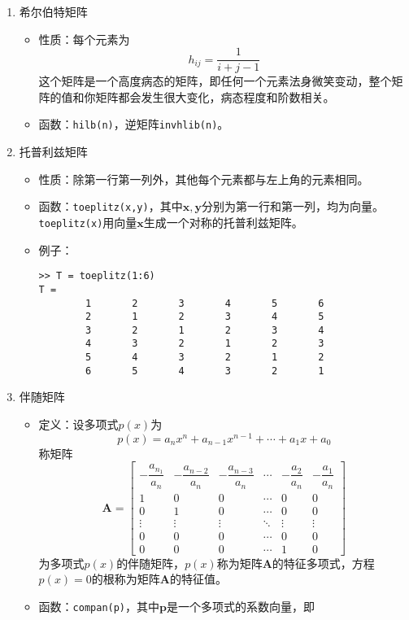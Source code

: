 \begin{enumerate}
\item 希尔伯特矩阵
\begin{itemize}
	\item 性质：每个元素为
	\begin{equation}
		h_{ij}=\frac{1}{i+j-1}
	\end{equation}
这个矩阵是一个高度病态的矩阵，即任何一个元素法身微笑变动，整个矩阵的值和你矩阵都会发生很大变化，病态程度和阶数相关。
\item 函数：\lstinline|hilb(n)|，逆矩阵\lstinline|invhlib(n)|。
\end{itemize}
\item  托普利兹矩阵
\begin{itemize}
	\item 性质：除第一行第一列外，其他每个元素都与左上角的元素相同。
	\item 函数：\lstinline|toeplitz(x,y)|，其中$\bm{x},\bm{y}$分别为第一行和第一列，均为向量。\lstinline|toeplitz(x)|用向量$\bm{x}$生成一个对称的托普利兹矩阵。
	\item 例子：
	\begin{lstlisting}
>> T = toeplitz(1:6)
T =
		1		2		3		4		5		6
		2		1		2		3		4		5
		3		2		1		2		3		4
		4		3		2		1		2		3
		5		4		3		2		1		2
		6		5		4		3		2		1
	\end{lstlisting}
\end{itemize}
\item 伴随矩阵
\begin{itemize}
	\item 定义：设多项式$p(x)$为
	\begin{equation}
		p(x)=a_nx^n+a_{n-1}x^{n-1}+\cdots +a_1x+a_0
	\end{equation}
	称矩阵
	\begin{equation}
		\bm{A} =
		\begin{bmatrix}
			-\dfrac{a_{n_1}}{a_n} & -\dfrac{a_{n-2}}{a_{n}} & -\dfrac{a_{n-3}}{a_{n}} & \cdots & -\dfrac{a_2}{a_n} & -\dfrac{a_1}{a_n}\\
			1 & 0 & 0 & \cdots & 0 & 0\\
			0 & 1 & 0 & \cdots & 0 & 0\\
			\vdots & \vdots & \vdots & \ddots & \vdots & \vdots\\
			0 & 0 & 0 & \cdots & 0 & 0\\
			0 & 0 & 0 & \cdots & 1 & 0
		\end{bmatrix}
	\end{equation}
为多项式$p(x)$的伴随矩阵，$p(x)$称为矩阵$\bm{A}$的特征多项式，方程$p(x)=0$的根称为矩阵$\bm{A}$的特征值。
\item 函数：\lstinline|compan(p)|，其中$\bm{p}$是一个多项式的系数向量，即

\end{itemize}
\end{enumerate}
